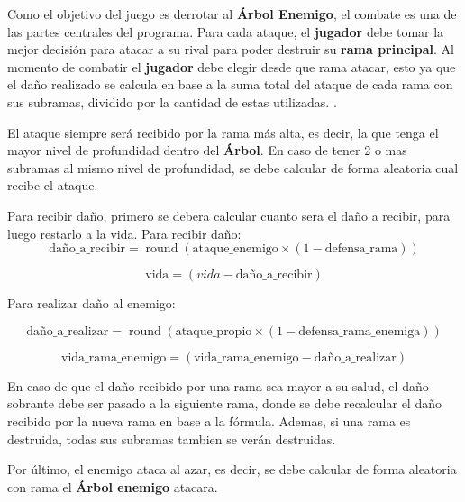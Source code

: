 \label{sec:combates}

Como el objetivo del juego es derrotar al \textbf{Árbol Enemigo}, el combate es una de las partes centrales del programa. Para cada ataque, el \textbf{jugador} debe tomar la mejor decisión para atacar a su rival para poder destruir su \textbf{rama principal}. Al momento de combatir el \textbf{jugador} debe elegir desde que rama atacar, esto ya que el daño realizado se calcula en base a la suma total del ataque de cada rama con sus subramas, dividido por la cantidad de estas utilizadas. . 

El ataque siempre será recibido por la rama más alta, es decir, la que tenga el mayor nivel de profundidad dentro del \textbf{Árbol}. En caso de tener 2 o mas subramas al mismo nivel de profundidad, se debe calcular de forma aleatoria cual recibe el ataque. 

Para recibir daño, primero se debera calcular cuanto sera el daño a recibir, para luego restarlo a la vida.    
Para recibir daño:
\[
\text{daño\_a\_recibir} = \operatorname{round} \left( \text{ataque\_enemigo} \times (1 - \text{defensa\_rama}) \right)
\]

\[
\text{vida} = (vida - \text{daño\_a\_recibir})
\]

Para realizar daño al enemigo:

\[
\text{daño\_a\_realizar} = \operatorname{round} \left( \text{ataque\_propio} \times (1 - \text{defensa\_rama\_enemiga}) \right)
\]

\[
\text{vida\_rama\_enemigo} = (\text{vida\_rama\_enemigo} - \text{daño\_a\_realizar})
\]

En caso de que el daño recibido por una rama sea mayor a su salud, el daño sobrante debe ser pasado a la siguiente rama, donde se debe recalcular el daño recibido por la nueva rama en base a la fórmula. Ademas, si una rama es destruida, todas sus subramas tambien se verán destruidas.

Por último, el enemigo ataca al azar, es decir, se debe calcular de forma aleatoria con rama el \textbf{Árbol enemigo} atacara.